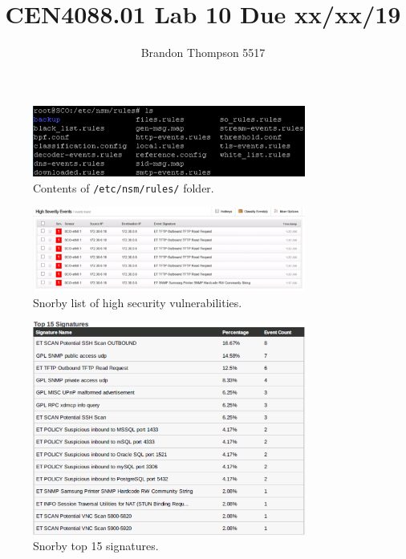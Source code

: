 \documentclass[a4paper]{article}
\begin{document}
	\title{CEN4088.01 Lab 10 Due xx/xx/19}
	\author{Brandon Thompson 5517}
	\maketitle

	\begin{figure}[ht!]
		\centering
		\includegraphics[width=0.8\textwidth]{1_1_15}
		\caption{Contents of \verb+/etc/nsm/rules/+ folder.}
		\label{fig:1_1_15}
	\end{figure}

	\begin{figure}[ht!]
		\centering
		\includegraphics[width=0.8\textwidth]{1_3_3}
		\caption{Snorby list of high security vulnerabilities.}
		\label{fig:1_3_3}
	\end{figure}

	\begin{figure}[ht!]
		\centering
		\includegraphics[width=0.8\textwidth]{1_3_13}
		\caption{Snorby top 15 signatures.}
		\label{fig:1_3_13}
	\end{figure}
\end{document}
